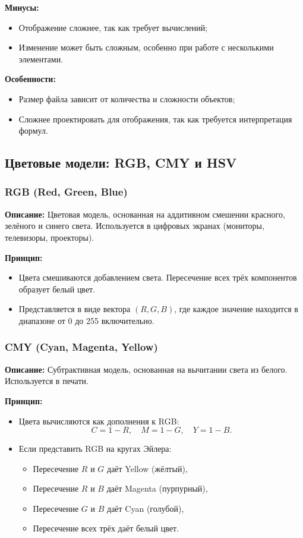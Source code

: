 \textbf{Минусы:}
\begin{itemize}
    \item Отображение сложнее, так как требует вычислений;
    \item Изменение может быть сложным, особенно при работе с несколькими элементами.
\end{itemize}

\textbf{Особенности:}
\begin{itemize}
    \item Размер файла зависит от количества и сложности объектов;
    \item Сложнее проектировать для отображения, так как требуется интерпретация формул.
\end{itemize}

\subsection{Цветовые модели: RGB, CMY и HSV}

\subsubsection{RGB (Red, Green, Blue)}
\textbf{Описание:}
Цветовая модель, основанная на аддитивном смешении красного, зелёного и синего света. Используется в цифровых экранах (мониторы, телевизоры, проекторы).

\textbf{Принцип:}
\begin{itemize}
    \item Цвета смешиваются добавлением света. Пересечение всех трёх компонентов образует белый цвет.
    \item Представляется в виде вектора $(R, G, B)$, где каждое значение находится в диапазоне от 0 до 255 включительно.
\end{itemize}

\subsubsection{CMY (Cyan, Magenta, Yellow)}
\textbf{Описание:}
Субтрактивная модель, основанная на вычитании света из белого. Используется в печати.

\textbf{Принцип:}
\begin{itemize}
    \item Цвета вычисляются как дополнения к RGB:
          \[
              C = 1 - R, \quad M = 1 - G, \quad Y = 1 - B.
          \]
    \item Если представить RGB на кругах Эйлера:
          \begin{itemize}
              \item Пересечение $R$ и $G$ даёт Yellow (жёлтый),
              \item Пересечение $R$ и $B$ даёт Magenta (пурпурный),
              \item Пересечение $G$ и $B$ даёт Cyan (голубой),
              \item Пересечение всех трёх даёт белый цвет.
          \end{itemize}
\end{itemize}

